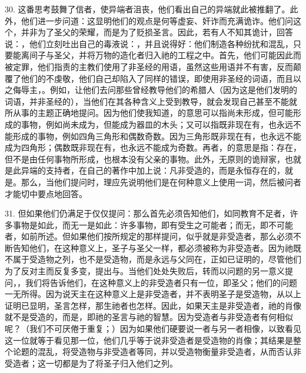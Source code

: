 30. 这番思考鼓舞了信者，使异端者沮丧，他们看出自己的异端就此被推翻了。此外，他们进一步问道：这显明他们的观点是何等虚妄、奸诈而充满诡诈。他们问这个，并非为了圣父的荣耀，而是为了贬损圣言。因此，若有人不知其诡计，回答说：，他们立刻吐出自己的毒液说：，并且说得好：他们制造各种纷扰和混乱，只要能离间子与圣父，并将万物的造化者归入祂的工程之中。首先，他们可能因此而被定罪，他们指责的主教们使用了非圣经的用语，虽然这些用语并不有害，反而颠覆了他们的不虔敬，他们自己却陷入了同样的错误，即使用非圣经的词语，而且以之侮辱主，。例如，让他们去问那些曾经教导他们的希腊人（因为这是他们发明的词语，并非圣经的），当他们在其各种含义上受到教导，就会发现自己甚至不能就所从事的主题正确地提问。因为他们使我知道，的意思可以指尚未形成，但可能形成的事物，例如尚未成为，但能成为器皿的木头；又可以指既非现在有，也永远不能形成的事物，例如四角三角形和偶数奇数。因为三角形既非现在有，也永远不能成为四角形；偶数既非现在有，也永远不能成为奇数。再者，的意思是指：存在，但不是由任何事物所形成，也根本没有父亲的事物。此外，无原则的诡辩家，也就是此异端的支持者，在自己的著作中加上说：凡非受造的，而是永恒存在的，就是。那么，当他们提问时，理应先说明他们是在何种意义上使用一词，然后被问者才能切中要点地回答。\par

31. 但如果他们仍满足于仅仅提问：那么首先必须告知他们，如同教育不足者，许多事物是如此，而无一是如此：许多事物，即有受生之可能者；而无，即不可能者，如前所述。但如果他们按所规定的那样提问，似乎就是非受造者，那么必须不断告知他们，在这种意义上，圣子与圣父一样，都必须被称为非受造者。因为祂既不属于受造物之列，也不是受造物，而是永远与父同在，正如已证明的，尽管他们为了反对主而反复多变，提出与。当他们处处失败后，转而以问题的另一意义提问，，我们将告诉他们，在这种意义上的非受造者只有一位，即圣父；他们的问题一无所得。因为说天主在这种意义上是非受造者，并不表明圣子是受造物，从以上证明已显明，圣言怎样，那生祂者也怎样。因此，如果天主是非受造者，祂的肖像就不是受造的，而是，即祂的圣言与祂的智慧。因为受造者与非受造者有何相似呢？（我们不可厌倦于重复；）因为如果他们硬要说一者与另一者相像，以致看见这一位就等于看见那一位，他们几乎等于说非受造者是受造物的肖像；其结果是整个论题的混乱，将受造物与非受造者等同，并以受造物衡量非受造者，从而否认非受造者；这一切都是为了将圣子归入他们之列。\par


